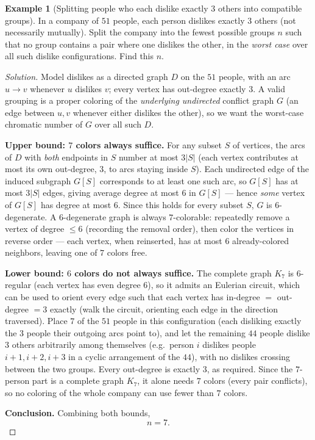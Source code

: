 \documentclass[11pt]{article}
\theoremstyle{definition}
\newtheorem{example}{Example}[section]
\begin{document}
\begin{example}[Splitting people who each dislike exactly $3$ others into compatible groups]
In a company of $51$ people, each person dislikes exactly $3$ others (not necessarily mutually). Split the company into the fewest possible groups $n$ such that no group contains a pair where one dislikes the other, in the \emph{worst case} over all such dislike configurations. Find this $n$.
\end{example}
\begin{proof}[Solution]
Model dislikes as a directed graph $D$ on the $51$ people, with an arc $u\to v$ whenever $u$ dislikes $v$; every vertex has out-degree exactly $3$. A valid grouping is a proper coloring of the \emph{underlying undirected} conflict graph $G$ (an edge between $u,v$ whenever either dislikes the other), so we want the worst-case chromatic number of $G$ over all such $D$.

\textbf{Upper bound: $7$ colors always suffice.} For any subset $S$ of vertices, the arcs of $D$ with \emph{both} endpoints in $S$ number at most $3|S|$ (each vertex contributes at most its own out-degree, $3$, to arcs staying inside $S$). Each undirected edge of the induced subgraph $G[S]$ corresponds to at least one such arc, so $G[S]$ has at most $3|S|$ edges, giving average degree at most $6$ in $G[S]$ — hence \emph{some} vertex of $G[S]$ has degree at most $6$. Since this holds for every subset $S$, $G$ is $6$-degenerate. A $6$-degenerate graph is always $7$-colorable: repeatedly remove a vertex of degree $\le6$ (recording the removal order), then color the vertices in reverse order — each vertex, when reinserted, has at most $6$ already-colored neighbors, leaving one of $7$ colors free.

\textbf{Lower bound: $6$ colors do not always suffice.} The complete graph $K_7$ is $6$-regular (each vertex has even degree $6$), so it admits an Eulerian circuit, which can be used to orient every edge such that each vertex has in-degree $=$ out-degree $=3$ exactly (walk the circuit, orienting each edge in the direction traversed). Place $7$ of the $51$ people in this configuration (each disliking exactly the $3$ people their outgoing arcs point to), and let the remaining $44$ people dislike $3$ others arbitrarily among themselves (e.g.\ person $i$ dislikes people $i+1,i+2,i+3$ in a cyclic arrangement of the $44$), with no dislikes crossing between the two groups. Every out-degree is exactly $3$, as required. Since the $7$-person part is a complete graph $K_7$, it alone needs $7$ colors (every pair conflicts), so no coloring of the whole company can use fewer than $7$ colors.

\textbf{Conclusion.} Combining both bounds,
\[
\boxed{n=7}.
\]
\end{proof}
\end{document}
